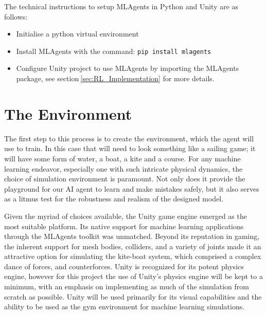 





The technical instructions to setup MLAgents in Python and Unity are as follows:
\begin{itemize}
    \item Initialise a python virtual environment
    \item Install MLAgents with the command: \texttt{pip install mlagents}
    \item Configure Unity project to use MLAgents by importing the MLAgents package, see section$~$\ref{sec:RL_Implementation} for more details.
\end{itemize}

\section{The Environment}

The first step to this process is to create the environment, which the agent will use to train. In this case that will need to look something like a sailing game; it will have some form of water, a boat, a kite and a course. 
For any machine learning endeavor, especially one with such intricate physical dynamics, the choice of simulation environment is paramount. Not only does it provide the playground for our AI agent to learn and make mistakes safely, but it also serves as a litmus test for the robustness and realism of the designed model.

Given the myriad of choices available, the Unity game engine emerged as the most suitable platform. Its native support for machine learning applications through the MLAgents toolkit was unmatched. Beyond its reputation in gaming, the inherent support for mesh bodies, colliders, and a variety of joints made it an attractive option for simulating the kite-boat system, which comprised a complex dance of forces, and counterforces. Unity is recognized for its potent physics engine, however for this project the use of Unity's physics engine will be kept to a minimum, with an emphasis on implementing as much of the simulation from scratch as possible. Unity will be used primarily for its visual capabilities and the ability to be used as the gym environment for machine learning simulations. 

